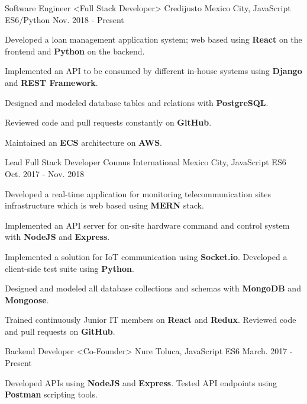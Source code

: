 \begin{cventries}
  \cventry
    {Software Engineer <Full Stack Developer>}
    {Credijusto}
    {Mexico City, JavaScript ES6/Python}
    {Nov. 2018 - Present}
    {
      \begin{cvitems}
        \item {Developed a loan management application system; web based using \textbf{React} on the frontend and \textbf{Python} on the backend.}
        \item {Implemented an API to be consumed by different in-house systems using \textbf{Django} and \textbf{REST Framework}.}
        \item {Designed and modeled database tables and relations with \textbf{PostgreSQL}.}
        \item {Reviewed code and pull requests constantly on \textbf{GitHub}.}
        \item {Maintained an \textbf{ECS} architecture on \textbf{AWS}. }
      \end{cvitems}
    }
  \cventry
    {Lead Full Stack Developer}
    {Connus International}
    {Mexico City, JavaScript ES6}
    {Oct. 2017 - Nov. 2018}
    {
      \begin{cvitems}
        \item {Developed a real-time application for monitoring telecommunication sites infrastructure which is web based using \textbf{MERN} stack.}
        \item {Implemented an API server for on-site hardware command and control system with \textbf{NodeJS} and \textbf{Express}.}
        \item {Implemented a solution for IoT communication using \textbf{Socket.io}. Developed a client-side test suite using \textbf{Python}. }
        \item {Designed and modeled all database collections and schemas with \textbf{MongoDB} and \textbf{Mongoose}.}
        \item {Trained continuously Junior IT members on \textbf{React} and \textbf{Redux}. Reviewed code and pull requests on \textbf{GitHub}.}
      \end{cvitems}
    }
  \cventry
    {Backend Developer <Co-Founder>}
    {Nure}
    {Toluca, JavaScript ES6}
    {March. 2017 - Present}
    {
      \begin{cvitems}
        \item {Developed APIs using \textbf{NodeJS} and \textbf{Express}. Tested API endpoints using \textbf{Postman} scripting tools.}

\end{cvitems}}
\end{cventries}
